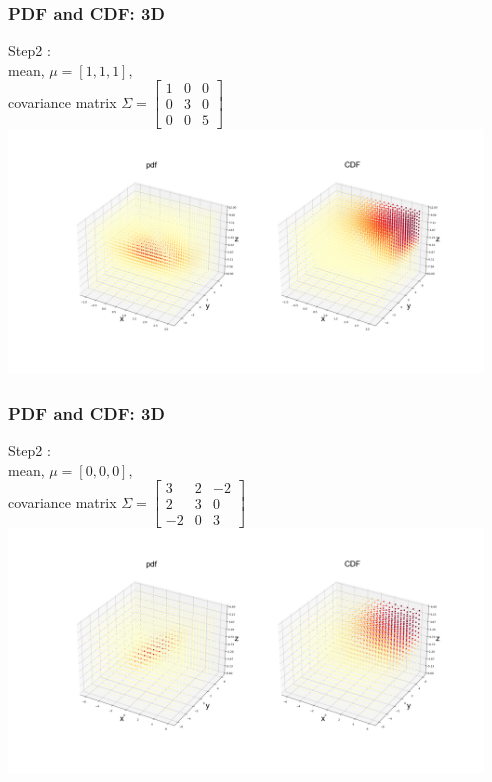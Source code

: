 \documentclass{beamer}
\begin{document}
\begin{frame}
\frametitle{PDF and CDF: 3D}
Step2 :
\\mean, $\mu = [1,1,1]$,\\
covariance matrix $\Sigma = \begin{bmatrix}
    1 & 0&0 \\
    0&3&0\\
    0&0&5
\end{bmatrix}$\newline\\
\includegraphics[height=6.5cm]{3D-2.png}
\end{frame}

\begin{frame}
\frametitle{PDF and CDF: 3D}
Step2 :
\\mean, $\mu = [0,0,0]$,\\
covariance matrix $\Sigma = \begin{bmatrix}
    3 & 2&-2 \\
    2&3&0\\
    -2&0&3
\end{bmatrix}$\newline\\
\includegraphics[height=6.5cm]{3D-3.png}
\end{frame}
\end{document}
